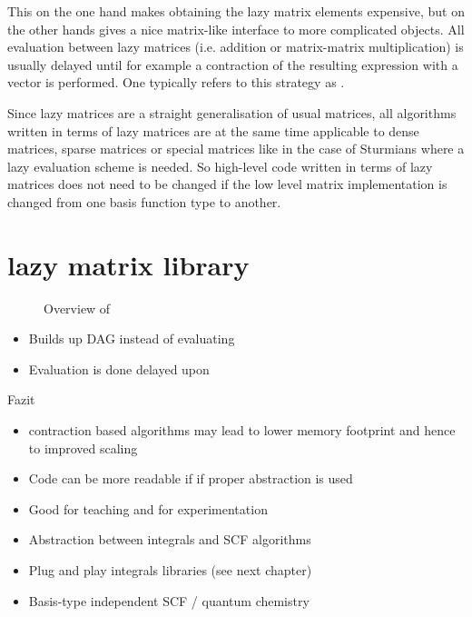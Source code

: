 This on the one hand makes obtaining the lazy matrix elements
expensive, but on the other hands gives a nice matrix-like
interface to more complicated objects.
All evaluation between lazy matrices
(i.e. addition or matrix-matrix multiplication)
is usually delayed until for example a contraction of the resulting
expression with a vector is performed.
One typically refers to this strategy as .

Since lazy matrices are a straight generalisation
of usual matrices,
all algorithms written in terms of lazy matrices
are at the same time applicable to dense matrices,
sparse matrices or special matrices like in the case of Sturmians
where a lazy evaluation scheme is needed.
So high-level code written in terms of lazy matrices
does not need to be changed if the low level matrix implementation
is changed from one basis function type to another.


%



\section{\lazyten lazy matrix library}

\begin{figure}
	\centering
	\caption{Overview of \lazyten}
	\label{fig:structureLazyten}
\end{figure}




\begin{itemize}
	\item Builds up DAG instead of evaluating
	\item Evaluation is done delayed upon \contraction
	
\end{itemize}

Fazit
\begin{itemize}
	\item contraction based algorithms may lead to lower memory footprint and
		hence to improved scaling
	\item Code can be more readable if if proper abstraction is used
	\item Good for teaching and for experimentation
	\item Abstraction between integrals and SCF algorithms
	\item Plug and play integrals libraries (see next chapter)
	\item Basis-type independent SCF / quantum chemistry
\end{itemize}



